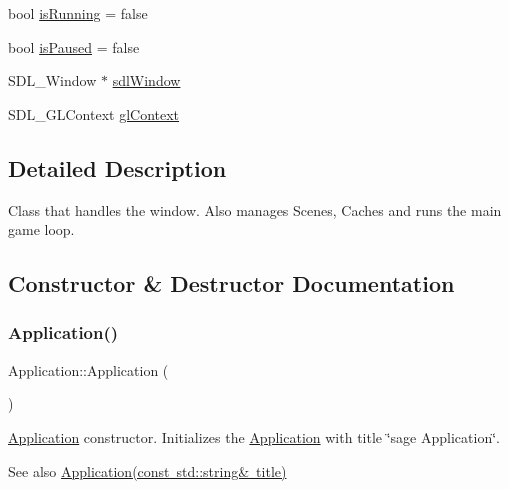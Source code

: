 \begin{DoxyCompactItemize}
\item 
bool \mbox{\hyperlink{classsage_1_1Application_aa5197cd07379bdbc371c26c21f936c17}{is\+Running}} = false
\item 
bool \mbox{\hyperlink{classsage_1_1Application_a2c8135f73ec3091ffcb750dcc280c4d2}{is\+Paused}} = false
\item 
S\+D\+L\+\_\+\+Window $\ast$ \mbox{\hyperlink{classsage_1_1Application_ab8d3166ecc1b2c3387da0633557f0d77}{sdl\+Window}}
\item 
S\+D\+L\+\_\+\+G\+L\+Context \mbox{\hyperlink{classsage_1_1Application_af4b3656acba3ea7f6409885223e49dc2}{gl\+Context}}
\end{DoxyCompactItemize}


\subsection{Detailed Description}
Class that handles the window. Also manages Scenes, Caches and runs the main game loop. 

\subsection{Constructor \& Destructor Documentation}
\mbox{\label{classsage_1_1Application_afa8cc05ce6b6092be5ecdfdae44e05f8}} 
\subsubsection{\texorpdfstring{Application()}{Application()}\hspace{0.1cm}{\footnotesize\ttfamily [1/3]}}
{\footnotesize\ttfamily Application\+::\+Application (\begin{DoxyParamCaption}{ }\end{DoxyParamCaption})}



\mbox{\hyperlink{classsage_1_1Application}{Application}} constructor. Initializes the \mbox{\hyperlink{classsage_1_1Application}{Application}} with title \char`\"{}sage Application\char`\"{}. 

\begin{DoxySeeAlso}{See also}
\mbox{\hyperlink{classsage_1_1Application_a357c8d817e692dae201b5b29148ad74d}{Application(const std\+::string\& title)}} 
\end{DoxySeeAlso}
\mbox{\label{classsage_1_1Application_a357c8d817e692dae201b5b29148ad74d}} 

